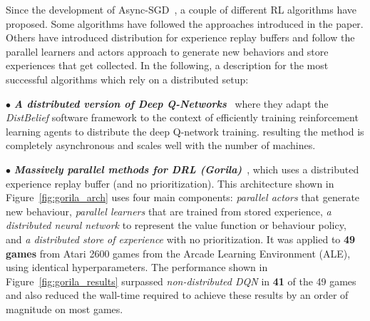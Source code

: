 Since the development of Async-SGD~\parencite{dean2012large}, a couple of different RL algorithms have proposed. Some algorithms have followed the approaches introduced in the paper. Others have introduced distribution for experience replay buffers and follow the parallel learners and actors approach to generate new behaviors and store experiences that get collected. In the following, a description for the most successful algorithms which rely on a distributed setup:

$\bullet$ \textit{\textbf{A distributed version of Deep Q-Networks}}~\parencite{ong2015distributed} where they adapt the \textit{DistBelief} software framework to the context of efficiently training reinforcement learning agents to distribute the deep Q-network training. resulting the method is completely asynchronous and scales well with the number of machines.

$\bullet$ \textit{\textbf{Massively parallel methods for DRL (Gorila)}}~\parencite{nair2015massively}, which uses a distributed experience replay buffer (and no prioritization). This architecture shown in Figure~\ref{fig:gorila_arch} uses four main components: \textit{parallel actors} that generate new behaviour, \textit{parallel learners} that are trained from stored experience, \textit{a distributed neural network} to represent the value function or behaviour policy, and \textit{a distributed store of experience} with no prioritization. It was applied to \textbf{49 games} from Atari 2600 games from the Arcade Learning Environment (ALE), using identical hyperparameters. The performance shown in Figure~\ref{fig:gorila_results} surpassed \textit{non-distributed DQN} in \textbf{41} of the 49 games and also reduced the wall-time required to achieve these results by an order of magnitude on most games.

